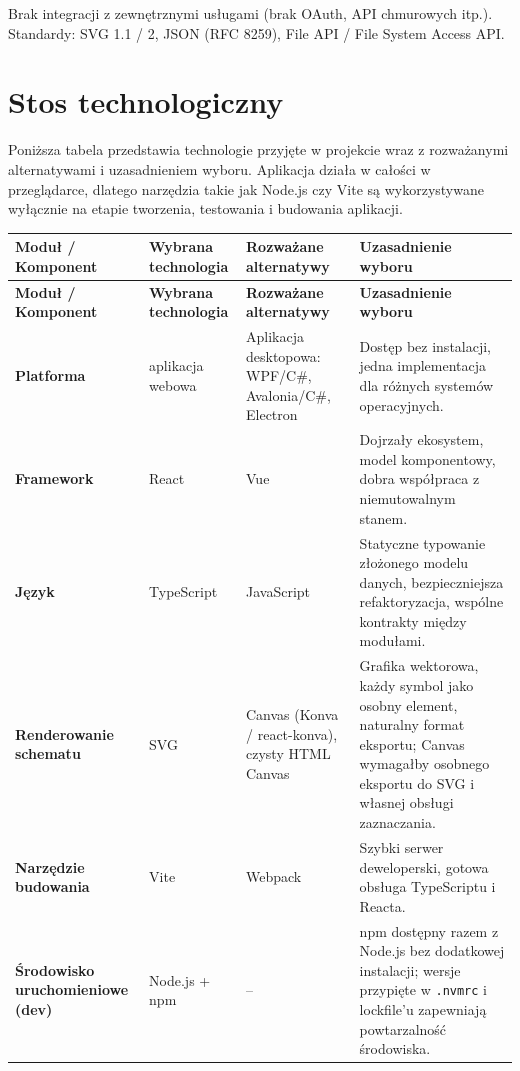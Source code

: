 \documentclass[a4paper,11pt]{article}
\begin{document}
Brak integracji z zewnętrznymi usługami (brak OAuth, API chmurowych itp.). Standardy: SVG 1.1 / 2, JSON (RFC 8259), File API / File System Access API.

\pagebreak

\section{Stos technologiczny}

Poniższa tabela przedstawia technologie przyjęte w projekcie wraz z rozważanymi alternatywami i uzasadnieniem wyboru. Aplikacja działa w całości w przeglądarce, dlatego narzędzia takie jak Node.js czy Vite są wykorzystywane wyłącznie na etapie tworzenia, testowania i budowania aplikacji.

\begin{xltabular}{0.95\textwidth}{|p{2.5cm}|p{2.3cm}|p{3.8cm}|X|}
  \hline
  \textbf{Moduł / Komponent} & \textbf{Wybrana technologia} & \textbf{Rozważane alternatywy} & \textbf{Uzasadnienie wyboru} \\
  \hline
  \endfirsthead
  \hline
  \textbf{Moduł / Komponent} & \textbf{Wybrana technologia} & \textbf{Rozważane alternatywy} & \textbf{Uzasadnienie wyboru} \\
  \hline
  \endhead
  \textbf{Platforma} & aplikacja webowa & Aplikacja desktopowa: WPF/C\#, Avalonia/C\#, Electron & Dostęp bez instalacji, jedna implementacja dla różnych systemów operacyjnych. \\
  \hline
  \textbf{Framework} & React & Vue & Dojrzały ekosystem, model komponentowy, dobra współpraca z niemutowalnym stanem. \\
  \hline
  \textbf{Język} & TypeScript & JavaScript & Statyczne typowanie złożonego modelu danych, bezpieczniejsza refaktoryzacja, wspólne kontrakty między modułami. \\
  \hline
  \textbf{Renderowanie schematu} & SVG & Canvas (Konva / react-konva), czysty HTML Canvas & Grafika wektorowa, każdy symbol jako osobny element, naturalny format eksportu; Canvas wymagałby osobnego eksportu do SVG i własnej obsługi zaznaczania. \\
  \hline
  \textbf{Narzędzie budowania} & Vite & Webpack & Szybki serwer deweloperski, gotowa obsługa TypeScriptu i Reacta. \\
  \hline
  \textbf{Środowisko uruchomieniowe (dev)} & Node.js + npm & -- & npm dostępny razem z Node.js bez dodatkowej instalacji; wersje przypięte w \texttt{.nvmrc} i lockfile'u zapewniają powtarzalność środowiska. \\

\end{xltabular}
\end{document}
